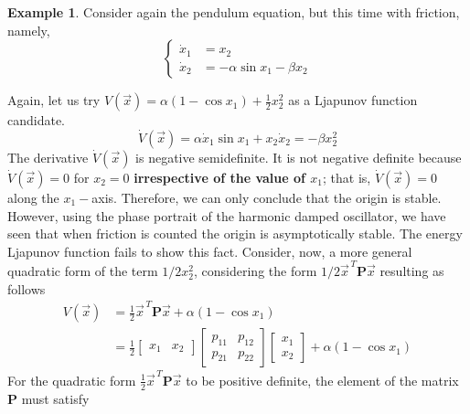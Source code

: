 \documentclass[11pt,a4paper,oneside]{book}
\numberwithin{equation}{section}
\theoremstyle{it}
\theoremstyle{definition}
\newtheorem{example}{Example}[chapter]
\begin{document}
\begin{example} 
	Consider again the pendulum equation, but this time with friction, namely, 
	\begin{equation*}
		\left\lbrace \begin{aligned}
			\dot{x}_1 &=  x_2 \\[6pt] 
			\dot{x}_2 &= -\alpha\sin x_1 -\beta x_2
		\end{aligned}\right. 
	\end{equation*}
	
	Again, let us try $V(\vec{x})=\alpha(1-\cos x_1) + \frac{1}{2}x_2^2$ as a 
	Ljapunov function candidate.
	\begin{equation*}
		\dot{V}(\vec{x})=\alpha\dot{x}_1\sin x_1+x_2\dot{x}_2 = -\beta x_2^2
	\end{equation*}
	The derivative $\dot{V}(\vec{x})$ is negative semidefinite. It is not 
	negative definite because $\dot{V}(\vec{x})=0$ for $x_2=0$ 
	\textbf{irrespective of the value of $x_1$}; that is, $\dot{V}(\vec{x})=0$ 
	along the $x_1-$axis. Therefore, we can only conclude that the origin is 
	stable. However, using the phase portrait of the harmonic damped 
	oscillator, we have seen that when friction is counted the origin is 
	asymptotically stable. The energy Ljapunov function fails to show this 
	fact. Consider, now, a more general quadratic form of the term $1/2x_2^2$, 
	considering the form $1/2\vec{x}^{\,T}\mathbf{P}\vec{x}$ resulting as 
	follows
	\begin{equation*}
		\begin{aligned}
			{V}(\vec{x})&=\frac{1}{2}\vec{x}^{\,T}\mathbf{P}\vec{x} + 
			\alpha(1-\cos x_1) \\[6pt]
			&= \frac{1}{2}\begin{bmatrix} x_1&x_2\end{bmatrix}\begin{bmatrix} 
			p_{11}&p_{12} \\[6pt] p_{21}&p_{22}\end{bmatrix} \begin{bmatrix} 
			x_1 \\[6pt] x_2\end{bmatrix} +\alpha(1-\cos x_1)
		\end{aligned}
	\end{equation*}
	For the quadratic form $\frac{1}{2}\vec{x}^{\,T}\mathbf{P}\vec{x}$ to be 
	positive definite, the element of the matrix $\mathbf{P}$ must satisfy 
	\begin{equation*}
		\begin{aligned}

\end{aligned}
\end{equation*}
\end{example}
\end{document}
